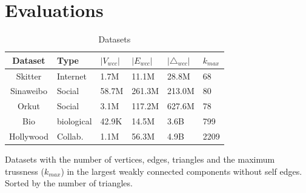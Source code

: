 \section{Evaluations}
\label{evaluation}
\begin{table}
\caption{Datasets}
\label{table:datasets} 
\begin{threeparttable}
	\centering
		\begin{tabularx}{\linewidth}{c|*{5}{Y}} 
		\toprule
			Dataset & Type & $|V_{wcc}|$ & $|E_{wcc}|$ & $|{\triangle}_{wcc}|$ & $k_{max}$ \\
			\midrule
			Skitter & Internet & 1.7M & 11.1M & 28.8M & 68 \\ 
			Sinaweibo & Social & 58.7M & 261.3M & 213.0M & 80 \\ 
			Orkut & Social & 3.1M & 117.2M & 627.6M & 78 \\
			Bio & biological & 42.9K & 14.5M & 3.6B & 799 \\
			Hollywood & Collab. & 1.1M & 56.3M & 4.9B & 2209 \\
			\bottomrule
			\end{tabularx}
			\begin{tablenotes}
				\item Datasets with the number of vertices, edges, triangles and the maximum trussness ($k_{max}$) in the largest weakly connected components without self edges. Sorted by the number of triangles.
			\end{tablenotes}
		\end{threeparttable}
\end{table}

